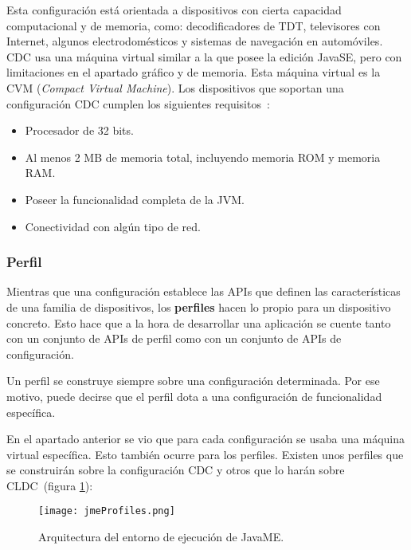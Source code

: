 \begin{itemize}
Esta configuración está orientada a dispositivos con cierta capacidad
computacional y de memoria, como: decodificadores de \acs{TDT}, televisores con
Internet, algunos electrodomésticos y sistemas de navegación en automóviles.
\acs{CDC} usa una máquina virtual similar a la que posee la edición
\acs{JavaSE}, pero con limitaciones en el apartado gráfico y de memoria. Esta 
máquina virtual es la \acs{CVM} (\emph{Compact Virtual Machine}).
Los dispositivos que soportan una configuración \acs{CDC} cumplen los
siguientes requisitos~\cite{bib:j2me}:
\begin{itemize}
  \item Procesador de 32 bits.
  \item Al menos 2 MB de memoria total, incluyendo memoria \acs{ROM} y
  memoria \acs{RAM}.
  \item Poseer la funcionalidad completa de la \acs{JVM}.
  \item Conectividad con algún tipo de red.
\end{itemize}
\end{itemize}

\subsubsection{Perfil}
Mientras que una configuración establece las \acs{API}s que definen las 
características de una familia de dispositivos, los \textbf{perfiles} hacen
lo propio para un dispositivo concreto. Esto hace que a la hora de
desarrollar una aplicación se cuente tanto con un conjunto de \acs{API}s 
de perfil como con un conjunto de \acs{API}s de configuración.

Un perfil se construye siempre sobre una configuración determinada. Por ese
motivo, puede decirse que el perfil dota a una configuración de funcionalidad
específica.

En el apartado anterior se vio que para cada configuración se usaba una
máquina virtual específica. Esto también ocurre para los perfiles. Existen
unos perfiles que se construirán sobre la configuración \acs{CDC} y otros
que lo harán sobre \acs{CLDC}~\cite{bib:j2me}(figura \ref{fig:jmeProfiles}):

  \begin{figure}[H]
    \begin{center}
      \texttt{[image: jmeProfiles.png]}
      \caption{Arquitectura del entorno de ejecución de \acs{JavaME}.}
      \label{fig:jmeProfiles}
    \end{center}
  \end{figure}

